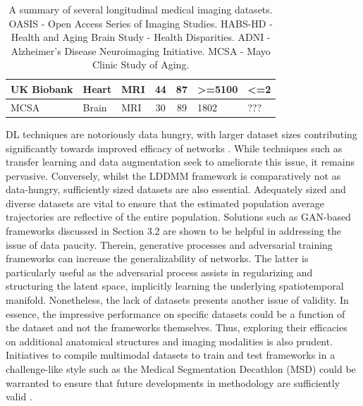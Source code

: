 \begin{table}[]
{\begin{tabular}{lllccll}
\multirow{-4}{*}{UK Biobank} & Heart      & MRI & \multirow{-4}{*}{44} & \multirow{-4}{*}{87} & \textgreater{}=5100  & \multirow{-4}{*}{\textless{}=2} \\ \hline
MCSA                         & Brain      & MRI & 30                   & 89                   & 1802                 & ??? \\ \hline                           
\end{tabular}}
\vspace{0.2cm}
\caption{A summary of several longitudinal medical imaging datasets. OASIS - Open Access Series of Imaging Studies. HABS-HD - Health and Aging Brain Study - Health Disparities. ADNI - Alzheimer's Disease Neuroimaging Initiative. MCSA - Mayo Clinic Study of Aging.}
\label{tab:my-table}
\end{table}

		DL techniques are notoriously data hungry, with larger dataset sizes contributing significantly towards improved efficacy of networks \cite{Sun_2017_ICCV, JungKye15}. While techniques such as transfer learning \cite{Alzubaidi2020} and data augmentation \cite{Mumuni2022} seek to ameliorate this issue, it remains pervasive. Conversely, whilst the LDDMM framework is comparatively not as data-hungry, sufficiently sized datasets are also essential. Adequately sized and diverse datasets are vital to ensure that the estimated population average trajectories are reflective of the entire population. Solutions such as GAN-based frameworks discussed in Section 3.2 are shown to be helpful in addressing the issue of data paucity. Therein, generative processes and adversarial training frameworks can increase the generalizability of networks. The latter is particularly useful as the adversarial process assists in regularizing and structuring the latent space, implicitly learning the underlying spatiotemporal manifold. Nonetheless, the lack of datasets presents another issue of validity. In essence, the impressive performance on specific datasets could be a function of the dataset and not the frameworks themselves. Thus, exploring their efficacies on additional anatomical structures and imaging modalities is also prudent. Initiatives to compile multimodal datasets to train and test frameworks in a challenge-like style such as the Medical Segmentation Decathlon (MSD) could be warranted to ensure that future developments in methodology are sufficiently valid \cite{Antonelli2022}. 
		  
